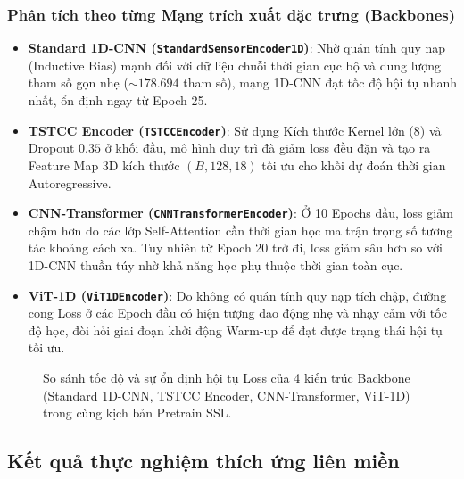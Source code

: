 \subsubsection{Phân tích theo từng Mạng trích xuất đặc trưng (Backbones)}

\begin{itemize}
    \item \textbf{Standard 1D-CNN (\texttt{StandardSensorEncoder1D})}: 
    Nhờ quán tính quy nạp (Inductive Bias) mạnh đối với dữ liệu chuỗi thời gian cục bộ và dung lượng tham số gọn nhẹ ($\sim 178.694$ tham số), mạng 1D-CNN đạt tốc độ hội tụ nhanh nhất, ổn định ngay từ Epoch 25.
    
    \item \textbf{TSTCC Encoder (\texttt{TSTCCEncoder})}: 
    Sử dụng Kích thước Kernel lớn ($8$) và Dropout $0.35$ ở khối đầu, mô hình duy trì đà giảm loss đều đặn và tạo ra Feature Map 3D kích thước $(B, 128, 18)$ tối ưu cho khối dự đoán thời gian Autoregressive.
    
    \item \textbf{CNN-Transformer (\texttt{CNNTransformerEncoder})}: 
    Ở 10 Epochs đầu, loss giảm chậm hơn do các lớp Self-Attention cần thời gian học ma trận trọng số tương tác khoảng cách xa. Tuy nhiên từ Epoch 20 trở đi, loss giảm sâu hơn so với 1D-CNN thuần túy nhờ khả năng học phụ thuộc thời gian toàn cục.
    
    \item \textbf{ViT-1D (\texttt{ViT1DEncoder})}: 
    Do không có quán tính quy nạp tích chập, đường cong Loss ở các Epoch đầu có hiện tượng dao động nhẹ và nhạy cảm với tốc độ học, đòi hỏi giai đoạn khởi động Warm-up để đạt được trạng thái hội tụ tối ưu.
\end{itemize}

\begin{figure}[h!]
\centering
\caption{So sánh tốc độ và sự ổn định hội tụ Loss của 4 kiến trúc Backbone (Standard 1D-CNN, TSTCC Encoder, CNN-Transformer, ViT-1D) trong cùng kịch bản Pretrain SSL.}
\label{fig:pretrain_backbone_comparison}
\end{figure}

\subsection{Kết quả thực nghiệm thích ứng liên miền}


